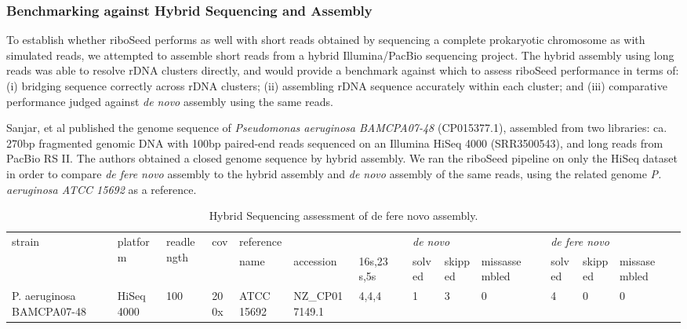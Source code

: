 \documentclass[11pt]{article}
\begin{document}
\begin{linenumbers}
\subsubsection*{Benchmarking against Hybrid Sequencing and Assembly}

To establish whether riboSeed performs as well with short reads obtained by sequencing a complete prokaryotic chromosome as with simulated reads, we attempted to assemble short reads from a hybrid Illumina/PacBio sequencing project. The hybrid assembly using long reads was able to resolve rDNA clusters directly, and would provide a benchmark against which to assess riboSeed performance in terms of: (i) bridging sequence correctly across rDNA clusters; (ii) assembling rDNA sequence accurately within each cluster; and (iii) comparative performance judged against \textit{de novo} assembly using the same reads.


Sanjar, et al published the genome sequence of \textit{Pseudomonas aeruginosa BAMCPA07-48} (CP015377.1)\cite{Sanjar2016}, assembled from two libraries: ca. 270bp fragmented genomic DNA with 100bp paired-end reads sequenced on an Illumina HiSeq 4000 (SRR3500543), and long reads from PacBio RS II. The authors obtained a closed genome sequence by hybrid assembly. We ran the riboSeed pipeline on only the HiSeq dataset in order to compare \textit{de fere novo} assembly to the hybrid assembly and \textit{de novo} assembly of the same reads, using the related genome \textit{P. aeruginosa ATCC 15692} as a reference.

\begin{table}[]
\centering
\caption{Hybrid Sequencing assessment of de fere novo assembly.}
\label{paohybrid}
\begin{tabular}{llllllllllllllll}
  \hline
  \multirow{2}{*}{strain} & \multirow{2}{*}{platform} & \multirow{2}{*}{readlength} & \multirow{2}{*}{cov} & \multicolumn{3}{l}{reference} &  & \multicolumn{3}{l}{\textit{de novo}} &  & \multicolumn{3}{l}{\textit{de fere novo}} &  \\
  \cline{5-7} \cline{9-11} \cline{13-15} &  &  &  & name & accession & 16s,23s,5s &  & solved & skipped & missassembled &  & solved & skipped & missasembled &  \\
  \hline
  P. aeruginosa BAMCPA07-48 & HiSeq 4000 & 100 & 200x & ATCC 15692 & NZ\_CP017149.1 & 4,4,4 &  & 1 & 3 & 0 &  & 4 & 0 & 0 &
\end{tabular}
\end{table}




\end{linenumbers}
\end{document}
